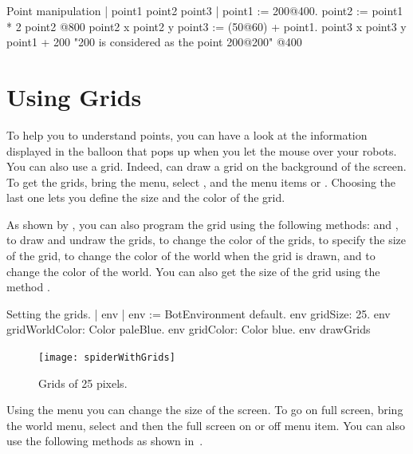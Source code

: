 \begin{scriptwithtitle}{Point manipulation}\label{scr:pointmultiple}
| point1 point2 point3 |
point1 := 200@400.
point2 := point1 * 2
point2 
@800
point2 x
point2 y
point3 := (50@60) + point1.
point3 x
point3 y
point1 + 200      "200 is considered as the point 200@200"
@400
\end{scriptwithtitle}


\section{Using Grids}
To help you to understand points, you can have a look at the information displayed in the balloon that pops up when you let the mouse over your robots. You can also use a grid. Indeed, \sq can draw a grid on the background of the screen. To get the grids, bring the  menu, select , and the menu items  or . Choosing the last one lets you define the size and the color of the grid. 

As shown by  , you can also program the grid using  the following methods:  and , to draw and undraw the grids,  to change the color of the grids,  to specify the size of the grid,   to change the color of the world when the grid is drawn, and  to change the color of the world. You can also get the size of the grid using the method .

\begin{scriptwithtitle}{Setting the grids.}\label{scr:grid}
| env | 
env := BotEnvironment default.
env gridSize: 25.
env gridWorldColor: Color paleBlue.
env gridColor: Color blue.
env drawGrids
\end{scriptwithtitle}

\begin{figure}
\begin{center}
\texttt{[image: spiderWithGrids]}
\end{center}
\caption{Grids of 25 pixels. \label{fig:spiderWithGrids}}
\end{figure}

Using the  menu you can change the size of the screen. 
To go on full screen, bring the world menu, select  and then the full screen on or off menu item. You can also use the following methods     as shown in~.


